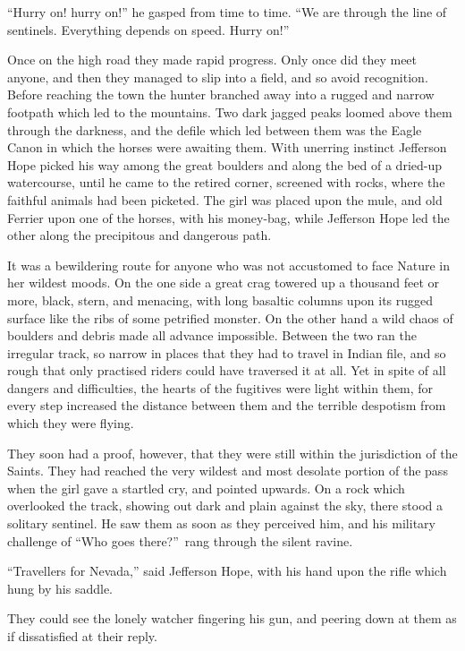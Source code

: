 \documentclass[12pt,english,oneside]{book}
\begin{document}
{}``Hurry on! hurry on!'' he gasped from time to time. {}``We are
through the line of sentinels. Everything depends on speed. Hurry
on!''

Once on the high road they made rapid progress. Only once did they
meet anyone, and then they managed to slip into a field, and so avoid
recognition. Before reaching the town the hunter branched away into
a rugged and narrow footpath which led to the mountains. Two dark
jagged peaks loomed above them through the darkness, and the defile
which led between them was the Eagle Canon in which the horses were
awaiting them. With unerring instinct Jefferson Hope picked his way
among the great boulders and along the bed of a dried-up watercourse,
until he came to the retired corner, screened with rocks, where the
faithful animals had been picketed. The girl was placed upon the mule,
and old Ferrier upon one of the horses, with his money-bag, while
Jefferson Hope led the other along the precipitous and dangerous path.

It was a bewildering route for anyone who was not accustomed to face
Nature in her wildest moods. On the one side a great crag towered
up a thousand feet or more, black, stern, and menacing, with long
basaltic columns upon its rugged surface like the ribs of some petrified
monster. On the other hand a wild chaos of boulders and debris made
all advance impossible. Between the two ran the irregular track, so
narrow in places that they had to travel in Indian file, and so rough
that only practised riders could have traversed it at all. Yet in
spite of all dangers and difficulties, the hearts of the fugitives
were light within them, for every step increased the distance between
them and the terrible despotism from which they were flying.

They soon had a proof, however, that they were still within the jurisdiction
of the Saints. They had reached the very wildest and most desolate
portion of the pass when the girl gave a startled cry, and pointed
upwards. On a rock which overlooked the track, showing out dark and
plain against the sky, there stood a solitary sentinel. He saw them
as soon as they perceived him, and his military challenge of {}``Who
goes there?''\ rang through the silent ravine.

{}``Travellers for Nevada,'' said Jefferson Hope, with his hand
upon the rifle which hung by his saddle.

They could see the lonely watcher fingering his gun, and peering down
at them as if dissatisfied at their reply.
\end{document}
